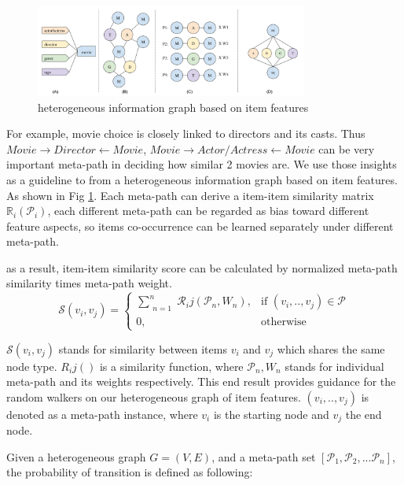 \begin{figure}[!t]
    \centering
    \includegraphics[width=0.8\textwidth]{figs/fig1.png}
    \caption{heterogeneous information graph based on item features}\label{fig:fe-graph}
\end{figure}

For example, movie choice is closely linked to directors and its casts. Thus $Movie \rightarrow Director \leftarrow Movie$, $Movie \rightarrow Actor/Actress \leftarrow Movie$  can be very important meta-path in deciding how similar 2 movies are. We use those insights as a guideline to from a heterogeneous information graph based on item features. As shown in Fig \ref{fig:fe-graph}.
Each meta-path can derive a item-item similarity matrix $\mathbb{R}_i(\mathcal{P}_i)$, each different meta-path can be regarded as bias toward different feature aspects, so items co-occurrence can be learned separately under different meta-path.

as a result, item-item similarity score can be calculated by normalized meta-path similarity times meta-path weight.
\begin{equation}\label{itemsim}
    \mathcal{S}(v_i,v_j) = 
    \begin{cases}
         \sum\limits_{\substack{n=1}}^{n} \mathcal{R}_ij(\mathcal{P}_n,{W_n}),& \text{if } (v_{i}, .., v_{j}) \in \mathcal{P} \\
         0,              & \text{otherwise}
     \end{cases}
\end{equation}

$\mathcal{S}(v_i,v_j)$ stands for similarity between items $v_i$ and $v_j$ which shares the same node type. $R_ij()$ is a similarity function, where $\mathcal{P}_n, {W_n}$ stands for individual meta-path and its weights respectively. This end result provides guidance for the random walkers on our heterogeneous graph of item features. $(v_{i}, .., v_{j})$ is denoted as a meta-path instance, where $v_i$ is the starting node and $v_j$ the end node.

Given a heterogeneous graph $G = (V,E)$, and a meta-path set $[\mathcal{P}_1, \mathcal{P}_2, ... \mathcal{P}_n]$, the probability of transition is defined as following:

